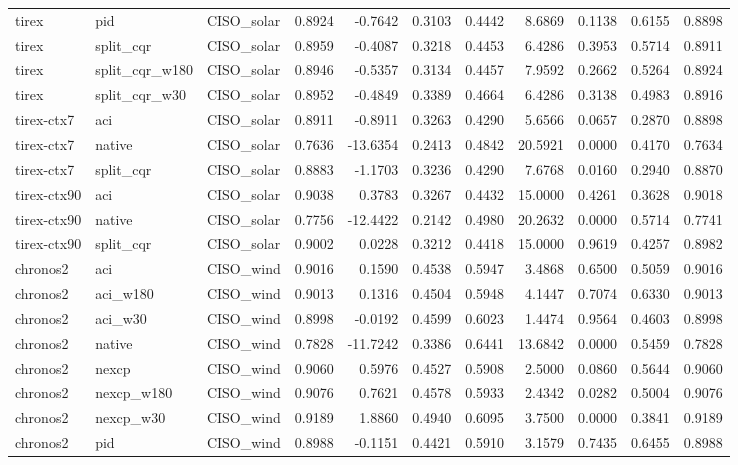 \begin{tabular}{lllrrrrrrrr}
tirex & pid & CISO_solar & 0.8924 & -0.7642 & 0.3103 & 0.4442 & 8.6869 & 0.1138 & 0.6155 & 0.8898 \\
tirex & split_cqr & CISO_solar & 0.8959 & -0.4087 & 0.3218 & 0.4453 & 6.4286 & 0.3953 & 0.5714 & 0.8911 \\
tirex & split_cqr_w180 & CISO_solar & 0.8946 & -0.5357 & 0.3134 & 0.4457 & 7.9592 & 0.2662 & 0.5264 & 0.8924 \\
tirex & split_cqr_w30 & CISO_solar & 0.8952 & -0.4849 & 0.3389 & 0.4664 & 6.4286 & 0.3138 & 0.4983 & 0.8916 \\
tirex-ctx7 & aci & CISO_solar & 0.8911 & -0.8911 & 0.3263 & 0.4290 & 5.6566 & 0.0657 & 0.2870 & 0.8898 \\
tirex-ctx7 & native & CISO_solar & 0.7636 & -13.6354 & 0.2413 & 0.4842 & 20.5921 & 0.0000 & 0.4170 & 0.7634 \\
tirex-ctx7 & split_cqr & CISO_solar & 0.8883 & -1.1703 & 0.3236 & 0.4290 & 7.6768 & 0.0160 & 0.2940 & 0.8870 \\
tirex-ctx90 & aci & CISO_solar & 0.9038 & 0.3783 & 0.3267 & 0.4432 & 15.0000 & 0.4261 & 0.3628 & 0.9018 \\
tirex-ctx90 & native & CISO_solar & 0.7756 & -12.4422 & 0.2142 & 0.4980 & 20.2632 & 0.0000 & 0.5714 & 0.7741 \\
tirex-ctx90 & split_cqr & CISO_solar & 0.9002 & 0.0228 & 0.3212 & 0.4418 & 15.0000 & 0.9619 & 0.4257 & 0.8982 \\
chronos2 & aci & CISO_wind & 0.9016 & 0.1590 & 0.4538 & 0.5947 & 3.4868 & 0.6500 & 0.5059 & 0.9016 \\
chronos2 & aci_w180 & CISO_wind & 0.9013 & 0.1316 & 0.4504 & 0.5948 & 4.1447 & 0.7074 & 0.6330 & 0.9013 \\
chronos2 & aci_w30 & CISO_wind & 0.8998 & -0.0192 & 0.4599 & 0.6023 & 1.4474 & 0.9564 & 0.4603 & 0.8998 \\
chronos2 & native & CISO_wind & 0.7828 & -11.7242 & 0.3386 & 0.6441 & 13.6842 & 0.0000 & 0.5459 & 0.7828 \\
chronos2 & nexcp & CISO_wind & 0.9060 & 0.5976 & 0.4527 & 0.5908 & 2.5000 & 0.0860 & 0.5644 & 0.9060 \\
chronos2 & nexcp_w180 & CISO_wind & 0.9076 & 0.7621 & 0.4578 & 0.5933 & 2.4342 & 0.0282 & 0.5004 & 0.9076 \\
chronos2 & nexcp_w30 & CISO_wind & 0.9189 & 1.8860 & 0.4940 & 0.6095 & 3.7500 & 0.0000 & 0.3841 & 0.9189 \\
chronos2 & pid & CISO_wind & 0.8988 & -0.1151 & 0.4421 & 0.5910 & 3.1579 & 0.7435 & 0.6455 & 0.8988 \\

\end{tabular}
